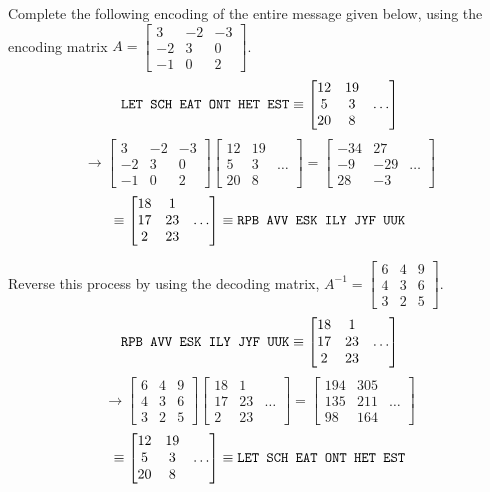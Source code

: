 \begin{applicationActivities}
\begin{activity}{10}
Complete the following encoding of the entire message given below,
using the encoding matrix \(A=\begin{bmatrix}3&-2&-3\\-2&3&0\\-1&0&2\end{bmatrix}\).
\[
\text{\texttt{LET SCH EAT ONT HET EST}}
\equiv
\begin{bmatrix}12&19\\5&3&\dots\\20&8\end{bmatrix}
\]
\[
\to
\begin{bmatrix}3&-2&-3\\-2&3&0\\-1&0&2\end{bmatrix}\begin{bmatrix}12&19\\5&3&\dots\\20&8\end{bmatrix}=
\begin{bmatrix}-34&27\\-9&-29&\dots\\28&-3\end{bmatrix}
\]
\[
\equiv
\begin{bmatrix}18&1\\17&23&\dots\\2&23\end{bmatrix}
\equiv
\text{\texttt{RPB AVV ESK ILY JYF UUK}}
\]
\end{activity}

\begin{activity}{10}
Reverse this process by using the decoding matrix,
\(A^{-1}=\begin{bmatrix}6&4&9\\4&3&6\\3&2&5\end{bmatrix}\).
\[
\text{\texttt{RPB AVV ESK ILY JYF UUK}}
\equiv
\begin{bmatrix}18&1\\17&23&\dots\\2&23\end{bmatrix}
\]
\[
\to
\begin{bmatrix}6&4&9\\4&3&6\\3&2&5\end{bmatrix}\begin{bmatrix}18&1\\17&23&\dots\\2&23\end{bmatrix}
=
\begin{bmatrix}194&305\\135&211&\dots\\98&164\end{bmatrix}
\]
\[
\equiv
\begin{bmatrix}12&19\\5&3&\dots\\20&8\end{bmatrix}
\equiv
\text{\texttt{LET SCH EAT ONT HET EST}}
\]
\end{activity}
\end{applicationActivities}

